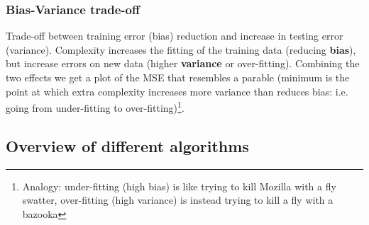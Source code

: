\documentclass[11pt]{article}
\begin{document}
\subsubsection{Bias-Variance trade-off}
Trade-off between training error (bias) reduction and increase in testing error (variance).
Complexity increases the fitting of the training data (reducing \textbf{bias}), but increase errors on new data (higher \textbf{variance} or over-fitting). Combining the two effects we get a plot of the MSE that resembles a parable (minimum is the point at which extra complexity increases more variance than reduces bias: i.e. going from under-fitting to over-fitting)\footnote{Analogy: under-fitting (high bias) is like trying to kill Mozilla with a fly swatter, over-fitting (high variance) is instead trying to kill a fly with a bazooka}.

\subsection{Overview of different algorithms}
\end{document}
